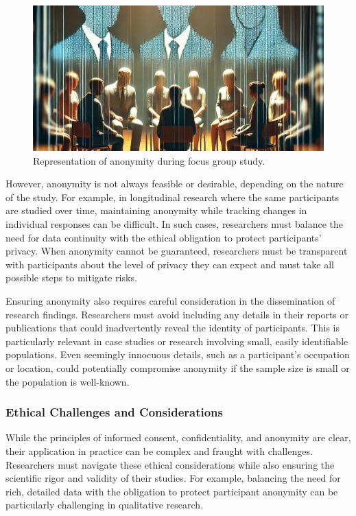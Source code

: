 \documentclass[
]{book}
\begin{document}
\begin{figure}
\centering
\includegraphics{images/fig01d.jpg}
\caption{Representation of anonymity during focus group study.}
\end{figure}

However, anonymity is not always feasible or desirable, depending on the nature of the study. For example, in longitudinal research where the same participants are studied over time, maintaining anonymity while tracking changes in individual responses can be difficult. In such cases, researchers must balance the need for data continuity with the ethical obligation to protect participants' privacy. When anonymity cannot be guaranteed, researchers must be transparent with participants about the level of privacy they can expect and must take all possible steps to mitigate risks.

Ensuring anonymity also requires careful consideration in the dissemination of research findings. Researchers must avoid including any details in their reports or publications that could inadvertently reveal the identity of participants. This is particularly relevant in case studies or research involving small, easily identifiable populations. Even seemingly innocuous details, such as a participant's occupation or location, could potentially compromise anonymity if the sample size is small or the population is well-known.

\subsubsection*{Ethical Challenges and Considerations}\label{ethical-challenges-and-considerations}

While the principles of informed consent, confidentiality, and anonymity are clear, their application in practice can be complex and fraught with challenges. Researchers must navigate these ethical considerations while also ensuring the scientific rigor and validity of their studies. For example, balancing the need for rich, detailed data with the obligation to protect participant anonymity can be particularly challenging in qualitative research.
\end{document}
